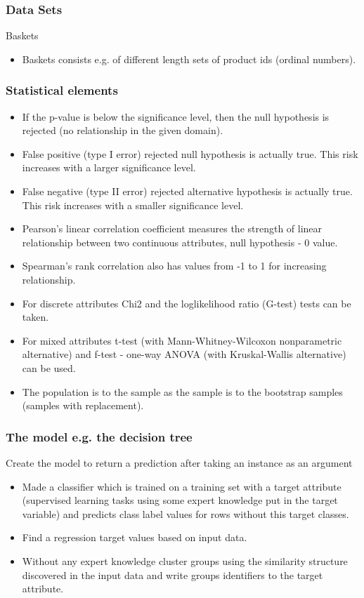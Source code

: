 \documentclass{beamer}
\begin{document}
\begin{frame}
\frametitle{Data Sets}
\begin{block}{Baskets}
\begin{itemize}
\item Baskets consists e.g. of different length sets of product ids (ordinal numbers).
\end{itemize}
\end{block}
\end{frame}

\begin{frame}
\footnotesize 
\frametitle{Statistical elements}
\begin{block}{}
\begin{itemize}
\item If the p-value is below the significance level, then the null hypothesis is rejected (no relationship in the given domain).
\item False positive (type I error) rejected null hypothesis is actually true. This risk increases with a larger significance level.
\item False negative (type II error) rejected alternative hypothesis is actually true. This risk increases with a smaller significance level.
\item Pearson's linear correlation coefficient measures the strength of linear relationship between two continuous attributes, null hypothesis - 0 value.
\item Spearman's rank correlation also has values from -1 to 1 for increasing relationship.
\item For discrete attributes Chi2 and the loglikelihood ratio (G-test) tests can be taken.
\item For mixed attributes t-test (with Mann-Whitney-Wilcoxon nonparametric alternative) and f-test - one-way ANOVA (with Kruskal-Wallis alternative) can be used.
\item The population is to the sample as the sample is to the bootstrap samples (samples with replacement).
\end{itemize}
\end{block}
\end{frame}

\begin{frame}
\frametitle{The model e.g. the decision tree}
\begin{block}{Create the model to return a prediction after taking an instance as an argument}
\begin{itemize}
\item Made a classifier which is trained on a training set with a target attribute (supervised learning tasks using some expert knowledge put in the target variable) and predicts class label values for rows without this target classes. 
\item Find a regression target values based on input data.
\item Without any expert knowledge cluster groups using the similarity structure discovered in the input data and write groups identifiers to the target attribute.
\end{itemize}
\end{block}
\end{frame}
\end{document}
